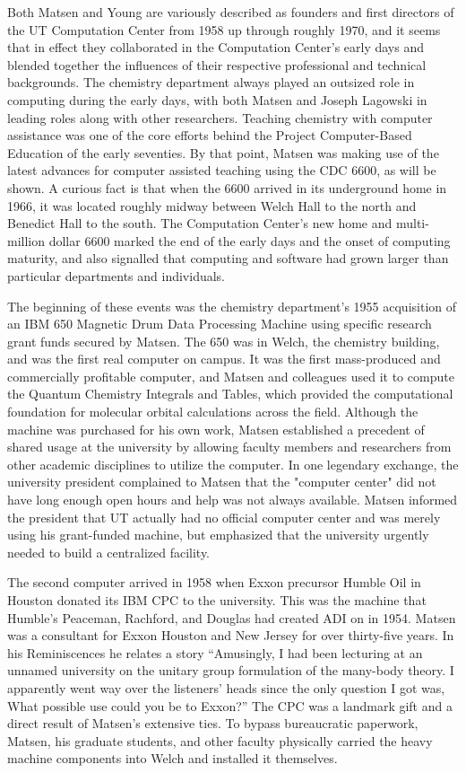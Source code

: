 Both Matsen and Young are variously described as founders and first directors of the UT Computation Center from 1958 up through roughly 1970, and it seems that in effect they collaborated in the Computation Center’s early days and blended together the influences of their respective professional and technical backgrounds. The chemistry department always played an outsized role in computing during the early days, with both Matsen and Joseph Lagowski in leading roles along with other researchers. Teaching chemistry with computer assistance was one of the core efforts behind the Project Computer-Based Education of the early seventies. By that point, Matsen was making use of the latest advances for computer assisted teaching using the CDC 6600, as will be shown. A curious fact is that when the 6600 arrived in its underground home in 1966, it was located roughly midway between Welch Hall to the north and Benedict Hall to the south. The Computation Center's new home and multi-million dollar 6600 marked the end of the early days and the onset of computing maturity, and also signalled that computing and software had grown larger than particular departments and individuals.

The beginning of these events was the chemistry department’s 1955 acquisition of an IBM 650 Magnetic Drum Data Processing Machine using specific research grant funds secured by Matsen. The 650 was in Welch, the chemistry building, and was the first real computer on campus. It was the first mass-produced and commercially profitable computer, and Matsen and colleagues used it to compute the Quantum Chemistry Integrals and Tables, which provided the computational foundation for molecular orbital calculations across the field. Although the machine was purchased for his own work, Matsen established a precedent of shared usage at the university by allowing faculty members and researchers from other academic disciplines to utilize the computer. In one legendary exchange, the university president complained to Matsen that the "computer center" did not have long enough open hours and help was not always available. Matsen informed the president that UT actually had no official computer center and was merely using his grant-funded machine, but emphasized that the university urgently needed to build a centralized facility. \cite{oakesFrederickAlbertMatsen2026}

The second computer arrived in 1958 when Exxon precursor Humble Oil in Houston donated its IBM CPC to the university. This was the machine that Humble's Peaceman, Rachford, and Douglas had created ADI on in 1954. Matsen was a consultant for Exxon Houston and New Jersey for over thirty-five years. In his Reminiscences he relates a story “Amusingly, I had been lecturing at an unnamed university on the unitary group formulation of the many-body theory. I apparently went way over the listeners' heads since the only question I got was, What possible use could you be to Exxon?” The CPC was a landmark gift and a direct result of Matsen’s extensive ties. To bypass bureaucratic paperwork, Matsen, his graduate students, and other faculty physically carried the heavy machine components into Welch and installed it themselves.

